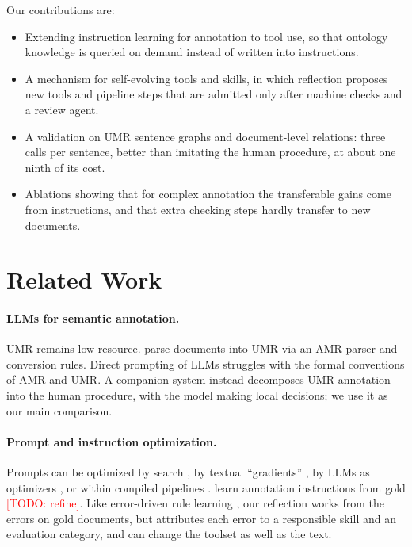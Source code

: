 \documentclass[11pt]{article}
\newcommand{\umr}{\textsc{UMR}\xspace}
\newcommand{\amr}{\textsc{AMR}\xspace}
\newcommand{\todo}[1]{\textcolor{red}{[TODO: #1]}}
\begin{document}
Our contributions are:
\begin{itemize}[leftmargin=*,itemsep=1pt,topsep=2pt]
  \item Extending instruction learning for annotation \citep{acl2026base} to tool use, so that ontology knowledge is queried on demand instead of written into instructions.
  \item A mechanism for self-evolving tools and skills, in which reflection proposes new tools and pipeline steps that are admitted only after machine checks and a review agent.
  \item A validation on \umr sentence graphs and document-level relations: three calls per sentence, better than imitating the human procedure, at about one ninth of its cost.
  \item Ablations showing that for complex annotation the transferable gains come from instructions, and that extra checking steps hardly transfer to new documents.
\end{itemize}

\section{Related Work}

\paragraph{LLMs for semantic annotation.}
\umr \citep{bonn2023umr,gysel2021design,bonn2025umr2} remains low-resource. \citet{chun2024pipeline} parse documents into \umr via an \amr parser and conversion rules. Direct prompting of LLMs struggles with the formal conventions of \amr and \umr \citep{ettinger2023expert,sun2024chinese}. A companion system \citep{anon2026orchestration} instead decomposes \umr annotation into the human procedure, with the model making local decisions; we use it as our main comparison.

\paragraph{Prompt and instruction optimization.}
Prompts can be optimized by search \citep{zhou2023ape}, by textual ``gradients'' \citep{pryzant2023protegi,yuksekgonul2025textgrad}, by LLMs as optimizers \citep{yang2024opro}, or within compiled pipelines \citep{khattab2024dspy}. \citet{acl2026base} learn annotation instructions from gold \todo{refine}. Like error-driven rule learning \citep{brill1995transformation}, our reflection works from the errors on gold documents, but attributes each error to a responsible skill and an evaluation category, and can change the toolset as well as the text.
\end{document}
